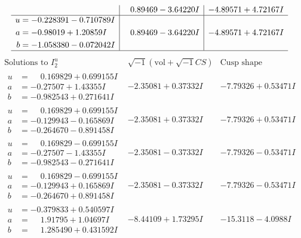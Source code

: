 \documentclass[1p]{elsarticle_modified}
\theoremstyle{definition}
\newcommand{\I}{\sqrt{-1}}
\begin{document}
$$\begin{array}{c|c|c}
 & \phantom{-}0.89469 - 3.64220 I & -4.89571 + 4.72167 I \\ \hline\begin{aligned}
u &= -0.228391 - 0.710789 I \\
a &= -0.98019 + 1.20859 I \\
b &= -1.058380 - 0.072042 I\end{aligned}
 & \phantom{-}0.89469 - 3.64220 I & -4.89571 + 4.72167 I\\
 \hline 
 \end{array}$$\newpage$$\begin{array}{c|c|c}  
\text{Solutions to }I^u_{2}& \I (\text{vol} + \sqrt{-1}CS) & \text{Cusp shape}\\
 \hline 
\begin{aligned}
u &= \phantom{-}0.169829 + 0.699155 I \\
a &= -0.27507 + 1.43355 I \\
b &= -0.982543 + 0.271641 I\end{aligned}
 & -2.35081 + 0.37332 I & -7.79326 + 0.53471 I \\ \hline\begin{aligned}
u &= \phantom{-}0.169829 + 0.699155 I \\
a &= -0.129943 - 0.165869 I \\
b &= -0.264670 - 0.891458 I\end{aligned}
 & -2.35081 + 0.37332 I & -7.79326 + 0.53471 I \\ \hline\begin{aligned}
u &= \phantom{-}0.169829 - 0.699155 I \\
a &= -0.27507 - 1.43355 I \\
b &= -0.982543 - 0.271641 I\end{aligned}
 & -2.35081 - 0.37332 I & -7.79326 - 0.53471 I \\ \hline\begin{aligned}
u &= \phantom{-}0.169829 - 0.699155 I \\
a &= -0.129943 + 0.165869 I \\
b &= -0.264670 + 0.891458 I\end{aligned}
 & -2.35081 - 0.37332 I & -7.79326 - 0.53471 I \\ \hline\begin{aligned}
u &= -0.379833 + 0.540597 I \\
a &= \phantom{-}1.91795 + 1.04697 I \\
b &= \phantom{-}1.285490 + 0.431592 I\end{aligned}
 & -8.44109 + 1.73295 I & -15.3118 - 4.0988 I \\ \hline\begin{aligned}

\end{aligned}
\end{array}$$
\end{document}
